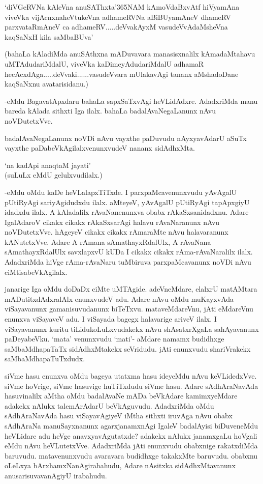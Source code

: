 \begin{shloka}
`diVGeRVNa kAleVna anuSAThxta\char'365NAM kAmoVdaBxvAtf hiVyamAna\\
viveVka vijAcnxnaheVtukeVna adhameRVNa aBiBUyamAneV dhameRV\\
parxvataRmAneV ca adhameRV.....deVvakAyxM vasudeVvAdaMsheVna kaqSaNxH kila saMbaBUva'
\end{shloka}

(bahaLa kAladiMda anuSAthxna mADuvavara manasisxnalilx kAmadaMtahavu uMTAdudariMdalU, viveVka kaDimeyAdudariMdalU adhamaR hecAcxdAga.....deVvaki......vasudeVvara mUlakavAgi tananx aMshadoDane kaqSaNxnu avatarisidanu.)

-eMdu BagavatApxdaru bahaLa sapxSaTxvAgi heVLidAdxre. AdadxriMda manu bareda kAlada sithxti Iga ilalx. bahaLa badalAvaNegaLanunx nAvu noVDutetxVve.

badalAvaNegaLanunx noVDi nAvu vayxthe paDuvudu nAyxyavAdarU aSuTx vayxthe paDabeVkAgilalxvenunxvudeV nananx sidAdhxMta.

\begin{shloka}
`na kadApi anaqtaM jayati'\\
(suLuLx eMdU gelulxvudilalx.)
\end{shloka}

-eMdu oMdu kaDe heVLalapxTiTxde. I parxpaMcavenunxvudu yAvAgalU pUtiRyAgi sariyAgidudxdu ilalx. aMteyeV, yAvAgalU pUtiRyAgi tapApxgiyU idadxdu ilalx. A kAladalilx rAvaNanenunxva obabx rAkaSxsanidadxnu. Adare IgalAdaroV cikakx cikakx rAkaSxsarAgi halavu rAvaNaranunx nAvu noVDutetxVve. hAgeyeV cikakx cikakx rAmaraMte nAvu halavaranunx kANutetxVve. Adare A rAmana sAmathayxRdalUlx, A rAvaNana sAmathayxRdalUlx savxlapxvU kUDa I cikakx cikakx rAma-rAvaNaralilx ilalx. AdadxriMda hiVge rAma-rAvaNaru tuMbiruva parxpaMcavanunx noVDi nAvu ciMtisabeVkAgilalx.

janarige Iga oMdu doDaDx ciMte uMTAgide. adeVneMdare, elalxrU matAMtara mADutitxdAdxralAlx enunxvudeV adu. Adare nAvu oMdu muKayxvAda viSayavanunx gamanisuvudanunx biTeTxvu. mataveMdareVnu, jAti eMdareVnu enunxva viSayaveV adu. I viSayada bagegx halavarige ariveV ilalx. I viSayavanunx kuritu tiLidukoLuLxvudakekx nAvu shAsatxrXgaLa sahAyavanunx paDeyabeVku. `mata' venunxvudu `mati'- aMdare namamx budidhxge saMbaMdhapaTaTx sidAdhxMtakekx seVridudu. jAti enunxvudu shariVrakekx saMbaMdhapaTuTxdudx.

siVme hasu enunxva oMdu bageya utatxma hasu ideyeMdu nAvu keVLidedxVve. siVme hoVrige, siVme hasuvige huTiTxdudu siVme hasu. Adare sAdhAraNavAda hasuvinalilx aMtha oMdu badalAvaNe mADa beVkAdare kamimxyeMdare adakekx nAlukx talemArAdarU beVkAguvudu. AdadxriMda oMdu sAdhAraNavAda hasu viSayavAgiyeV iMtha sithxti iruvAga nAvu obabx sAdhAraNa manuSayxnanunx agarxjanamxnAgi IgaleV badalAyisi biDuveneMdu heVLidare adu heVge anavxyavAgutatxde? adakekx nAlukx janamxgaLu hoVgali eMdu nAvu heVLutetxVve. AdadxriMda jAti enunxvudu obabxnige rakatxdiMda baruvudu. matavenunxvudu avaravara budidhxge takakxMte baruvudu. obabxnu oLeLxya bArxhamxNanAgirabahudu, Adare nAsitxka sidAdhxMtavanunx anusarisuvavanAgiyU irabahudu.

